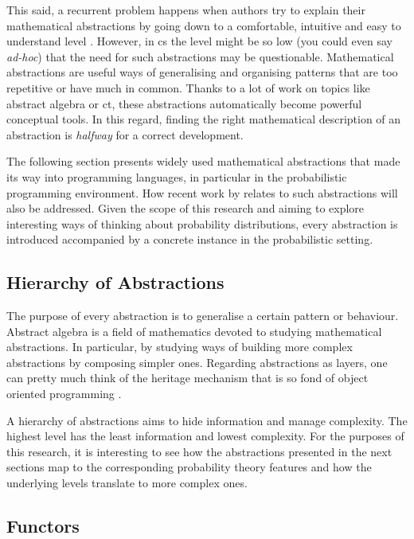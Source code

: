 \documentclass[
  oneside,
  11pt, a4paper,
  footinclude=true,
  headinclude=true,
  cleardoublepage=empty
]{scrbook}
\theoremstyle{definition}
\theoremstyle{definition}
\begin{document}
	This said, a recurrent problem happens when authors try to explain their mathematical abstractions by going down to a comfortable, intuitive and easy to understand level \citep{DBLP:journals/corr/abs-1803-10195}. However, in \gls{cs} the level might be so low (you could even say \emph{ad-hoc}) that the need for such abstractions may be questionable. Mathematical abstractions are useful ways of generalising and organising patterns that are too repetitive or have much in common. Thanks to a lot of work on topics like abstract algebra or \gls{ct}, these abstractions automatically become powerful conceptual tools. In this regard, finding the right mathematical description of an abstraction is \emph{halfway} for a correct development.
	    
	The following section presents widely used mathematical abstractions that made its way into programming languages, in particular in the probabilistic programming environment. How recent work by \cite{andrey2019selective} relates to such abstractions will also be addressed. Given the scope of this research and aiming to explore interesting ways of thinking about probability distributions, every abstraction is introduced accompanied by a concrete instance in the probabilistic setting.
	    
	    \subsection{Hierarchy of Abstractions}
	    
	The purpose of every abstraction is to generalise a certain pattern or behaviour. Abstract algebra is a field of mathematics devoted to studying mathematical abstractions. In particular, by studying ways of building more complex abstractions by composing simpler ones. Regarding abstractions as layers, one can pretty much think of the heritage mechanism that is so fond of object oriented programming \citep{Liskov:1987:KAD:62139.62141}.
	    
	A hierarchy of abstractions aims to hide information and manage complexity. The highest level has the least information and lowest complexity. For the purposes of this research, it is interesting to see how the abstractions presented in the next sections map to the corresponding probability theory features and how the underlying levels translate to more complex ones.
	
	    \subsection{Functors}
	    
\end{document}

